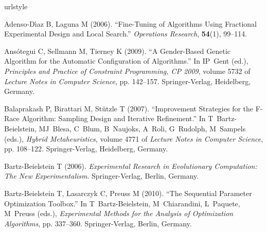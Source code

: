 \documentclass[article,a4paper,nojss,notitle]{jss}
\newcommand{\SoftwarePackage}{\pkg}
\begin{document}
\renewcommand{\doi}[1]{\href{http://dx.doi.org/#1}{\normalfont\texttt{doi:\nolinkurl{#1}}}}
\newcommand{\Rpackage}{\pkg}
%
\providecommand{\MaxMinAntSystem}{{$\cal MAX$--$\cal MIN$} {A}nt {S}ystem}
  \providecommand{\Rpackage}[1]{#1} \providecommand{\SoftwarePackage}[1]{#1}
  \providecommand{\proglang}[1]{#1}
\begin{thebibliography}{34}
\newcommand{\enquote}[1]{``#1''}
\providecommand{\natexlab}[1]{#1}
\providecommand{\url}[1]{\texttt{#1}}
\providecommand{\urlprefix}{URL }
\expandafter\ifx\csname urlstyle\endcsname\relax
  \providecommand{\doi}[1]{doi:\discretionary{}{}{}#1}\else
  \providecommand{\doi}{doi:\discretionary{}{}{}\begingroup
  \urlstyle{rm}\Url}\fi
\providecommand{\eprint}[2][]{\url{#2}}

Adenso-D{\'\i}az B, Laguna M (2006).
\newblock \enquote{Fine-Tuning of Algorithms Using Fractional Experimental
  Design and Local Search.}
\newblock \emph{Operations Research}, \textbf{54}(1), 99--114.

Ans{\'o}tegui C, Sellmann M, Tierney K (2009).
\newblock \enquote{A Gender-Based Genetic Algorithm for the Automatic
  Configuration of Algorithms.}
\newblock In IP~Gent (ed.), \emph{Principles and Practice of Constraint
  Programming, CP 2009}, volume 5732 of \emph{Lecture Notes in Computer
  Science}, pp. 142--157. Springer-Verlag, Heidelberg, Germany.

Balaprakash P, Birattari M, St{\"u}tzle T (2007).
\newblock \enquote{Improvement Strategies for the {F}-Race Algorithm: Sampling
  Design and Iterative Refinement.}
\newblock In T~Bartz-Beielstein, MJ~Blesa, C~Blum, B~Naujoks, A~Roli,
  G~Rudolph, M~Sampels (eds.), \emph{Hybrid Metaheuristics}, volume 4771 of
  \emph{Lecture Notes in Computer Science}, pp. 108--122. Springer-Verlag,
  Heidelberg, Germany.

Bartz-Beielstein T (2006).
\newblock \emph{Experimental Research in Evolutionary Computation: The New
  Experimentalism}.
\newblock Springer-Verlag, Berlin, Germany.

Bartz-Beielstein T, Lasarczyk C, Preuss M (2010).
\newblock \enquote{The Sequential Parameter Optimization Toolbox.}
\newblock In T~Bartz-Beielstein, M~Chiarandini, L~Paquete, M~Preuss (eds.),
  \emph{Experimental Methods for the Analysis of Optimization Algorithms}, pp.
  337--360. Springer-Verlag, Berlin, Germany.


\end{thebibliography}
\end{document}
